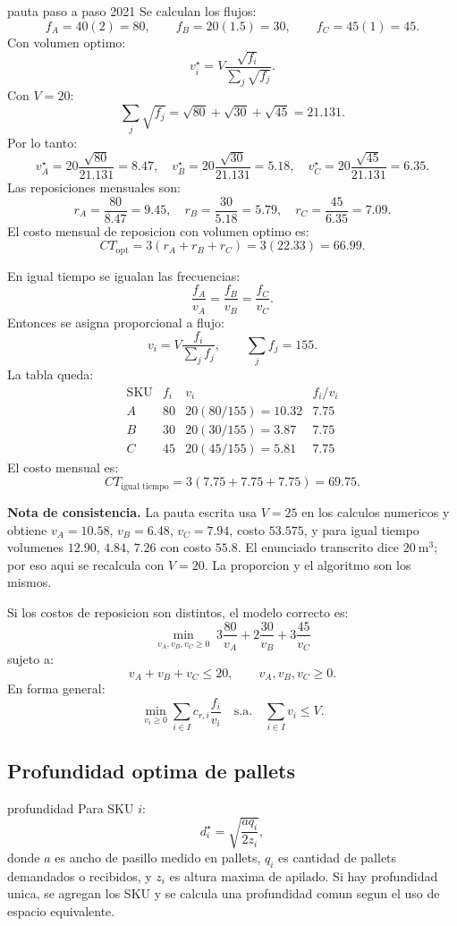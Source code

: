\begin{pautacompleta}{pauta paso a paso 2021}
Se calculan los flujos:
\[
  f_A=40(2)=80,\qquad f_B=20(1.5)=30,\qquad f_C=45(1)=45.
\]
Con volumen optimo:
\[
  v_i^\star=V\frac{\sqrt{f_i}}{\sum_j \sqrt{f_j}}.
\]
Con $V=20$:
\[
  \sum_j\sqrt{f_j}=\sqrt{80}+\sqrt{30}+\sqrt{45}=21.131.
\]
Por lo tanto:
\[
  v_A^\star=20\frac{\sqrt{80}}{21.131}=8.47,\quad
  v_B^\star=20\frac{\sqrt{30}}{21.131}=5.18,\quad
  v_C^\star=20\frac{\sqrt{45}}{21.131}=6.35.
\]
Las reposiciones mensuales son:
\[
  r_A=\frac{80}{8.47}=9.45,\quad
  r_B=\frac{30}{5.18}=5.79,\quad
  r_C=\frac{45}{6.35}=7.09.
\]
El costo mensual de reposicion con volumen optimo es:
\[
  CT_{\text{opt}}=3(r_A+r_B+r_C)=3(22.33)=66.99.
\]

En igual tiempo se igualan las frecuencias:
\[
  \frac{f_A}{v_A}=\frac{f_B}{v_B}=\frac{f_C}{v_C}.
\]
Entonces se asigna proporcional a flujo:
\[
  v_i=V\frac{f_i}{\sum_j f_j},\qquad \sum_j f_j=155.
\]
La tabla queda:
\[
\begin{array}{c|ccc}
\text{SKU} & f_i & v_i & f_i/v_i\\
\hline
A&80&20(80/155)=10.32&7.75\\
B&30&20(30/155)=3.87&7.75\\
C&45&20(45/155)=5.81&7.75
\end{array}
\]
El costo mensual es:
\[
  CT_{\text{igual tiempo}}=3(7.75+7.75+7.75)=69.75.
\]

\textbf{Nota de consistencia.} La pauta escrita usa $V=25$ en los calculos numericos y obtiene $v_A=10.58$, $v_B=6.48$, $v_C=7.94$, costo $53.575$, y para igual tiempo volumenes $12.90$, $4.84$, $7.26$ con costo $55.8$. El enunciado transcrito dice $20\ \text{m}^3$; por eso aqui se recalcula con $V=20$. La proporcion y el algoritmo son los mismos.

Si los costos de reposicion son distintos, el modelo correcto es:
\[
  \min_{v_A,v_B,v_C\geq 0}\;
  3\frac{80}{v_A}+2\frac{30}{v_B}+3\frac{45}{v_C}
\]
sujeto a:
\[
  v_A+v_B+v_C\leq 20,
  \qquad
  v_A,v_B,v_C\geq 0.
\]
En forma general:
\[
  \min_{v_i\geq 0}\sum_{i\in I} c_{r,i}\frac{f_i}{v_i}
  \quad\text{s.a.}\quad
  \sum_{i\in I}v_i\leq V.
\]
\end{pautacompleta}

\subsection{Profundidad optima de pallets}

\begin{materia}{profundidad}
Para SKU $i$:
\[
  d_i^\star=\sqrt{\frac{a q_i}{2z_i}},
\]
donde $a$ es ancho de pasillo medido en pallets, $q_i$ es cantidad de pallets demandados o recibidos, y $z_i$ es altura maxima de apilado. Si hay profundidad unica, se agregan los SKU y se calcula una profundidad comun segun el uso de espacio equivalente.
\end{materia}

